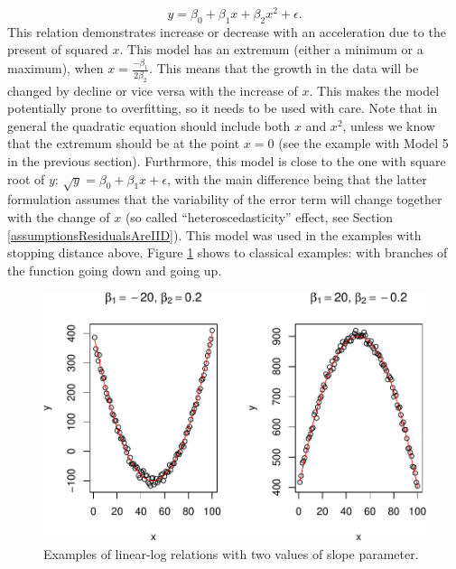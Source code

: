 \documentclass[
]{book}
\theoremstyle{definition}
\theoremstyle{definition}
\theoremstyle{definition}
\theoremstyle{definition}
\theoremstyle{remark}
\begin{document}
\begin{equation}
    y = \beta_0 + \beta_1 x + \beta_2 x^2 + \epsilon .
    \label{eq:transformQuadratic}
\end{equation}
This relation demonstrates increase or decrease with an acceleration due to the present of squared \(x\). This model has an extremum (either a minimum or a maximum), when \(x=\frac{-\beta_1}{2 \beta_2}\). This means that the growth in the data will be changed by decline or vice versa with the increase of \(x\). This makes the model potentially prone to overfitting, so it needs to be used with care. Note that in general the quadratic equation should include both \(x\) and \(x^2\), unless we know that the extremum should be at the point \(x=0\) (see the example with Model 5 in the previous section). Furthrmore, this model is close to the one with square root of \(y\): \(\sqrt y = \beta_0 + \beta_1 x + \epsilon\), with the main difference being that the latter formulation assumes that the variability of the error term will change together with the change of \(x\) (so called ``heteroscedasticity'' effect, see Section \ref{assumptionsResidualsAreIID}). This model was used in the examples with stopping distance above. Figure \ref{fig:transformationsExamples05} shows to classical examples: with branches of the function going down and going up.

\begin{figure}
\centering
\includegraphics{Svetunkov---Statistics-for-Business-Analytics_files/figure-latex/transformationsExamples05-1.pdf}
\caption{\label{fig:transformationsExamples05}Examples of linear-log relations with two values of slope parameter.}
\end{figure}
\end{document}
